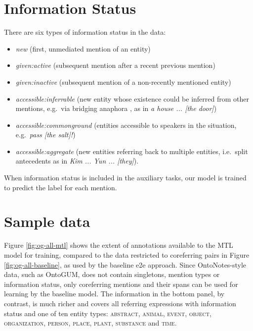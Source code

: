 \documentclass[11pt]{article}
\begin{document}
\section{Information Status}
\label{sec:appendix_infstat}
There are six types of information status in the data: 

\begin{itemize}[itemsep=0pt]
    \item \textit{new} (first, unmediated mention of an entity)
    \item \textit{given:active} (subsequent mention after a recent previous mention)
    \item \textit{given:inactive} (subsequent mention of a non-recently mentioned entity)
    \item \textit{accessible:inferrable} (new entity whose existence could be inferred from other mentions, e.g.~via bridging anaphora \cite{roesiger-etal-2018-bridging,hou-2020-bridging}, as in \textit{a house ... [the door]})
    \item \textit{accessible:commonground} (entities accessible to speakers in the situation, e.g.~\textit{pass [the salt]!})
    \item \textit{accessible:aggregate} (new entities referring back to multiple entities, i.e.~split antecedents as in \textit{Kim ... Yun ... [they]}). 

\end{itemize}

\noindent When information status is included in the auxiliary tasks, our model is trained to predict the label for each mention.

\section{Sample data}
\label{sec:appendix_sample}

Figure \ref{fig:og-all-mtl} shows the extent of annotations available to the MTL model for training, compared to the data restricted to coreferring pairs in Figure \ref{fig:og-all-baseline}, as used by the baseline e2e approach. Since OntoNotes-style data, such as OntoGUM, does not contain singletons, mention types or information status, only coreferring mentions and their spans can be used for learning by the baseline model. The information in the bottom panel, by contrast, is much richer and covers all referring expressions with information status and one of ten entity types: \textsc{abstract, animal, event, object, organization, person, place, plant, substance} and \textsc{time}.
\end{document}
